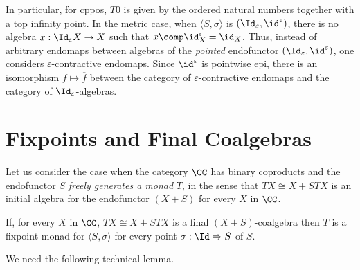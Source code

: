 \documentclass[11pt,a4paper]{article}
\newcommand{\tuple}[1]{\langle #1 \rangle }
\renewcommand{\alg}[1]{#1 \mbox{-\textit{Alg}}}
\newcommand{\efunctor}{S}
\newcommand{\contr}{\sigma}
\newcommand{\contrcat}{\sigma \mbox{-\textit{EndoMaps}}}
\newcommand{\factored}[1]{\overline{#1}}
\newcommand{\pointedfunctor}{\tuple{\efunctor , \contr}}
\newcommand{\ti}{T}
\newcommand{\esse}{S}
\begin{document}
In particular, for cppos, $T0$ is given by the ordered natural numbers
together with a top infinity point.  In the metric case, when
$\pointedfunctor$ is $(\Id_\varepsilon ,\id^\varepsilon )$, there is
no algebra $x: \Id_\varepsilon X \rightarrow X$ such that $x\comp
\id_X^\varepsilon = \id_X$.  Thus, instead of arbitrary endomaps
between algebras of the \emph{pointed} endofunctor $(\Id_\varepsilon
,\id^\varepsilon )$, one considers $\varepsilon$-contractive endomaps.
Since $\id^\varepsilon$ is pointwise epi, there is an isomorphism
$f\mapsto \factored{f}$ between the category of
$\varepsilon$-contractive endomaps and the category of
$\Id_\varepsilon$-algebras.





\section{Fixpoints and Final Coalgebras}

Let us consider the case when the category $\CC$ has binary coproducts
and the endofunctor $\esse$ \emph{freely generates a monad}
$\ti$, in the sense that
$\ti X \cong X+\esse \ti X$
is an initial algebra for the endofunctor $(X+\esse )$
for every $X$ in $\CC$.


\begin{proposition}
\label{propoabove}
  If, for every $X$ in $\CC$,
$\ti X\cong X+\esse \ti X$ is a 
final $(X+\esse )$-coalgebra
then
$\ti$ is a fixpoint monad
for $\pointedfunctor$
for every point $\sigma :\Id \Rightarrow S$ of $S$.
\end{proposition}

We need the following technical lemma.
\end{document}
